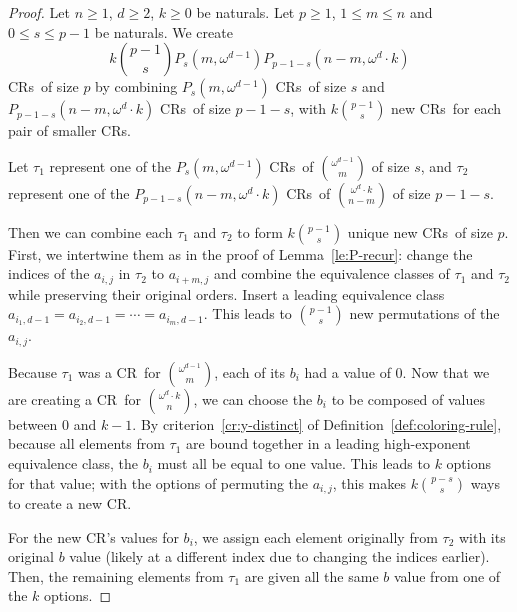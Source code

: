 \documentclass[11pt]{article}
\newcommand{\om}{\omega}
\newcommand{\crulenospace}{CR}
\newcommand{\crule}{\crulenospace~}
\newcommand{\crules}{\crulenospace s~}
\newcommand{\crulesnospace}{\crulenospace s}
\newcommand{\numpoints}{n}
\newcommand{\inumpoints}{i}
\newcommand{\idegr}{j}
\newcommand{\commonconst}{a}
\newcommand{\rareconst}{b}
\theoremstyle{plain}
\theoremstyle{definition}
\begin{document}
\begin{proof}
Let $\numpoints \geq 1$, $d \geq 2$, $k \geq 0$ be naturals. Let $p \geq 1$, $1 \leq m \leq \numpoints$ and $0 \leq s \leq p-1$ be naturals.
We create $$k \binom{p-1}{s} P_s \left( m,\om^{d-1} \right) P_{p-1-s} \left( \numpoints-m,\om^d \cdot k\right)$$ \crules of size $p$ by combining $P_s \left( m,\om^{d-1} \right)$ \crules of size $s$ and $P_{p-1-s} \left( \numpoints-m,\om^d \cdot k\right)$ \crules of size $p-1-s$, with $k \binom{p-1}{s}$ new \crules for each pair of smaller \crulesnospace.

Let $\tau_1$ represent one of the $P_s\left(m, \om^{d-1}\right)$ \crules of $\binom{\om^{d-1}}{m}$ of size $s$, and $\tau_2$ represent one of the $P_{p-1-s}\left(\numpoints-m, \om^d \cdot k\right)$ \crules of $\binom{\om^{d} \cdot k}{\numpoints-m}$ of size $p-1-s$. 

Then we can combine each $\tau_1$ and $\tau_2$ to form $k \binom{p-1}{s}$ unique new \crules of size $p.$ First, we intertwine them as in the proof of Lemma~\ref{le:P-recur}: change the indices of the $\commonconst_{\inumpoints,\idegr}$ in $\tau_2$ to $\commonconst_{\inumpoints+m,\idegr}$ and combine the equivalence classes of $\tau_1$ and $\tau_2$ while preserving their original orders. Insert a leading equivalence class $\commonconst_{\inumpoints_1,d-1} = \commonconst_{\inumpoints_2,d-1} = \cdots = \commonconst_{\inumpoints_m,d-1}.$ This leads to $\binom{p-1}{s}$ new permutations of the $\commonconst_{\inumpoints,\idegr}$.

Because $\tau_1$ was a \crule for $\binom{\om^{d-1}}{m}$, each of its $\rareconst_{\inumpoints}$ had a value of 0. Now that we are creating a 
\crule for $\binom{\om^d \cdot k}{\numpoints}$, we can choose the $\rareconst_{\inumpoints}$ to be
composed of values between 0 and $k-1$. By criterion~\ref{cr:y-distinct} of Definition~\ref{def:coloring-rule}, because all elements from $\tau_1$ are bound together in a leading high-exponent equivalence class, the $\rareconst_{\inumpoints}$ must all be equal to one value. This leads to $k$ options for that value; with the options of permuting the $\commonconst_{\inumpoints,\idegr}$, this makes $k \binom{p-s}{s}$ ways to create a new \crulenospace.

For the new \crulenospace's values for $\rareconst_{\inumpoints}$, we assign each element originally from $\tau_2$ with its original $\rareconst$ value (likely at a different index due to changing the indices earlier). Then, the remaining elements from $\tau_1$ are given all the same 
$\rareconst$
value from one of the $k$ options.


\end{proof}
\end{document}
